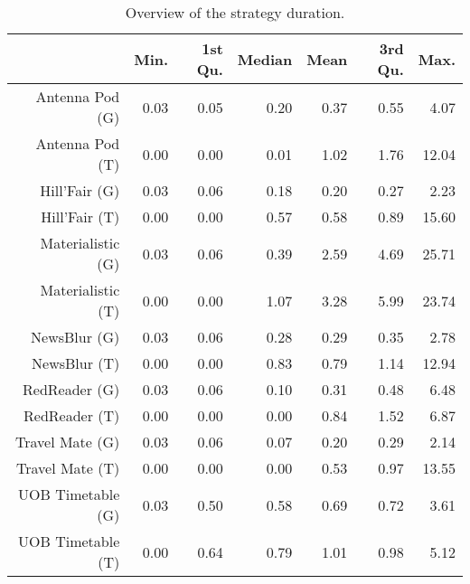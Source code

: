 \begin{table}[ht]
\centering
\begin{tabular}{rrrrrrr}
  \hline
 & Min. & 1st Qu. & Median & Mean & 3rd Qu. & Max. \\ 
  \hline
Antenna Pod (G) & 0.03 & 0.05 & 0.20 & 0.37 & 0.55 & 4.07 \\ 
  Antenna Pod (T) & 0.00 & 0.00 & 0.01 & 1.02 & 1.76 & 12.04 \\ 
  Hill'Fair (G) & 0.03 & 0.06 & 0.18 & 0.20 & 0.27 & 2.23 \\ 
  Hill'Fair (T) & 0.00 & 0.00 & 0.57 & 0.58 & 0.89 & 15.60 \\ 
  Materialistic (G) & 0.03 & 0.06 & 0.39 & 2.59 & 4.69 & 25.71 \\ 
  Materialistic (T) & 0.00 & 0.00 & 1.07 & 3.28 & 5.99 & 23.74 \\ 
  NewsBlur (G) & 0.03 & 0.06 & 0.28 & 0.29 & 0.35 & 2.78 \\ 
  NewsBlur (T) & 0.00 & 0.00 & 0.83 & 0.79 & 1.14 & 12.94 \\ 
  RedReader (G) & 0.03 & 0.06 & 0.10 & 0.31 & 0.48 & 6.48 \\ 
  RedReader (T) & 0.00 & 0.00 & 0.00 & 0.84 & 1.52 & 6.87 \\ 
  Travel Mate (G) & 0.03 & 0.06 & 0.07 & 0.20 & 0.29 & 2.14 \\ 
  Travel Mate (T) & 0.00 & 0.00 & 0.00 & 0.53 & 0.97 & 13.55 \\ 
  UOB Timetable (G) & 0.03 & 0.50 & 0.58 & 0.69 & 0.72 & 3.61 \\ 
  UOB Timetable (T) & 0.00 & 0.64 & 0.79 & 1.01 & 0.98 & 5.12 \\ 
   \hline
\end{tabular}
\caption{Overview of the strategy duration.} 
\label{tab:results:rq0:summary:duration_subject}
\end{table}
